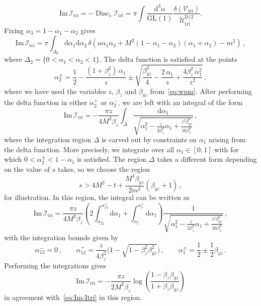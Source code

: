 \documentclass[12pt]{article}
\numberwithin{figure}{section}
\DeclareMathOperator{\Disc}{Disc}
\def \be {\begin{equation}}
\def \ee {\end{equation}}
\def \D {\mathrm{D}}
\def \U {\mathcal{U}}
\def \d {\mathrm{d}}
\def \V {\mathcal{V}}
\def \I {\mathcal{I}}
\def \Im {\mathrm{Im}}
\def \GL {\mathrm{GL}}
\def \triangle {\mathrm{tri}}
\begin{document}
    \be
    \Im\, \I_{\triangle} = - \Disc_s \I_{\triangle} = \pi \int \frac{\d^3 \alpha}{\GL(1)} \frac{\delta(\V_{\triangle})}{\U_{\triangle}^{\D/2}}.
    \ee
    Fixing $\alpha_3 = 1 - \alpha_1 - \alpha_2$ gives
    \be
    \Im\, \I_{\triangle} = \pi \int_{\Delta_2} \!\!\!\d \alpha_1 \d \alpha_2\, \delta\!\left(u \alpha_1 \alpha_2 + M^2 (1{-}\alpha_1 {-}\alpha_2)(\alpha_1 {+} \alpha_2) - m^2\right) \,,
    \ee
    where $\Delta_2 = \{ 0 < \alpha_1 < \alpha_2 < 1\}$. The delta function is satisfied at the points
    \be
        \alpha_2^{\pm} = \frac{1}{2} - \frac{(1+\beta_z^2)\, \alpha_1}{z} \pm \sqrt{\frac{\beta_{yz}^2}{4}-\frac{2 \, \alpha_1}{z} + \frac{4 \beta_z^2 \, \alpha_1^2}{z^2}} \,,
    \ee
    where we have used the variables $z$, $\beta_z$ and $\beta_{yz}$ from~\eqref{eq:wpm}.
    After performing the delta function in either $\alpha_2^+$ or $\alpha_2^-$, we are left with an integral of the form
    \be 
        \Im\, \I_{\triangle} = -
        \frac{\pi z}{4 M^2 \beta_z} \int_\Delta \frac{\d \alpha_1 }{\sqrt{\alpha_1^2 - \frac{z }{2 \beta_z^2} \alpha_1+\frac{z^2 \beta_{yz}^2}{16 \beta_z^2}}}\, ,
    \ee 
    where the integration region $\Delta$ is carved out by constraints on $\alpha_1$ arising from the delta function. More precisely, we integrate over all $\alpha_1 \in [0,1]$ with for which $0<\alpha_2^\pm<1-\alpha_1$ is satisfied. The region $\Delta$ takes a different form depending on the value of $s$ takes, so we choose the region
    \be 
        s > 4 M^2 - t + \frac{M^4 \beta_{yz}}{2 m^2}(\beta_{yz}+1) \,,
    \ee 
    for illustration.
    In this region, the integral can be written as
    \be
    \Im\, \I_{\triangle} = \frac{\pi z}{4 M^2 \beta_z}
    \left( 2 \int_{\alpha_{12}^-}^{\alpha_{12}^+} 
    \d \alpha_1
    +
    \int_{\alpha_{1}^-}^{\alpha_{1}^+} 
    \d \alpha_1
    \right)
    \frac{1}{\sqrt{\alpha_1^2 - \frac{z }{2 \beta_z^2} \alpha_1+\frac{z^2 \beta_{yz}^2}{16 \beta_z^2}}} \,,
    \ee
    with the integration bounds given by 
    \be
    \alpha_{12}^- = 0\,,
    \qquad
    \alpha_{12}^+ = \frac{z}{4 \beta_z^2} \big(1- \sqrt{1-\beta_{z}^2\beta_{yz}^2} \big) \,,
    \qquad 
    \alpha_{1}^\pm = \frac{1}{2} \pm \frac{1}{2} \beta_{yz} \,.
    \ee
    Performing the integrations gives
    \be 
        \Im\, \I_\triangle = 
        - \frac{\pi z}{2 M^2 \beta_z}
        \log \left( 
        \frac{1-\beta_z \beta_{yz}}{1+\beta_z \beta_{yz}}
        \right)
    \ee 
    in agreement with~\eqref{eq:Im-Itri} in this region.

    
\end{document}
